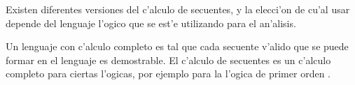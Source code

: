 \vspace{2em}

Existen diferentes versiones del c'alculo de secuentes, y la elecci'on de cu'al usar depende del lenguaje l'ogico que se est'e utilizando para el an'alisis.

Un lenguaje con c'alculo completo es tal que cada secuente v'alido que se puede formar en el lenguaje es demostrable. El c'alculo de secuentes es un c'alculo completo para ciertas l'ogicas, por ejemplo para la l'ogica de primer orden \cite{bookFoundations}. 